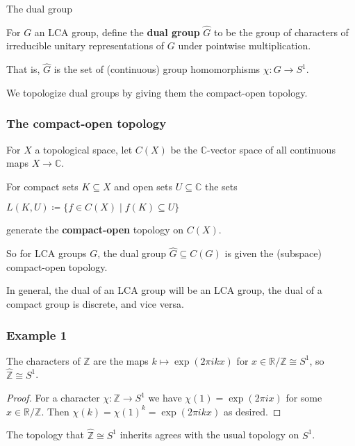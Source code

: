 \documentclass[mathserif
, handout
]{beamer}
\begin{document}
\begin{frame}{The dual group}
    \begin{definition}
        For $G$ an LCA group, define the \textbf{dual group} $\widehat{\hspace{0pt}G}$ to be the group of characters of irreducible unitary representations of $G$ under pointwise multiplication.\pause 
        
        That is, $\widehat{\hspace{0pt}G}$ is the set of (continuous) group homomorphisms $\chi\colon G\to S^1$.
    \end{definition} %
    \pause

    We topologize dual groups by giving them the compact-open topology.
\end{frame}

\begin{frame}
    \frametitle{The compact-open topology}
    \begin{definition}
        For $X$ a topological space, let $C(X)$ be the $\mathbb{C}$-vector space of all continuous maps $X\to \mathbb C$.
        \pause 

        For compact sets $K\subseteq X$ and open sets $U\subseteq \mathbb C$ the sets \begin{center}
            $L(K,U)\coloneqq\{f\in C(X)\mid f(K)\subseteq U\}$
        \end{center} generate the \textbf{compact-open} topology on $C(X)$.
    \end{definition} 
    \pause
    
    So for LCA groups $G$, the dual group $\widehat{\hspace{0pt}G}\subseteq C(G)$ is given the (subspace) compact-open topology.\pause 

    In general, the dual of an LCA group will be an LCA group, the dual of a compact group is discrete, and vice versa.
\end{frame}

\begin{frame}
    \frametitle{Example 1}
The characters of $\mathbb{Z}$ are the maps $k\mapsto \exp(2\pi i k x)$ for $x\in \mathbb{R}/\mathbb{Z}\cong S^1$, so $\widehat{\mathbb{Z}}\cong S^1$. \pause 
\begin{proof}
    For a character $\chi\colon \mathbb{Z}\to S^1$ we have $\chi(1) = \exp(2\pi i x)$ for some $x\in \mathbb{R}/\mathbb{Z}$. Then $\chi(k) = \chi(1)^k = \exp(2\pi i k x)$ as desired.
\end{proof}
\pause 

The topology that $\widehat{\mathbb{Z}}\cong S^1$ inherits agrees with the usual topology on $S^1$.
\end{frame}
\end{document}
